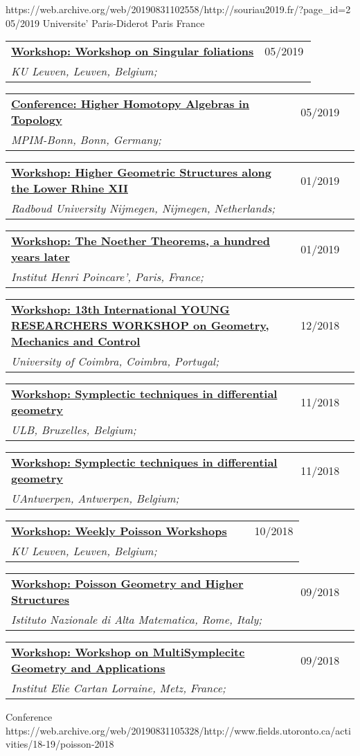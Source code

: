 \documentclass[a4paper]{article}
\newcommand{\longvoice}[8]{
	\begin{tabular}{p{0.83\linewidth} p{0.17\linewidth} }
		\textbf{\href{#3}{#2: #1}} & #4 
		\\ 
		\textit{#5, #6, #7;} & {\small\emph{#8}}
	\end{tabular}
	\vspace{.5em}
}
\begin{document}
		{https://web.archive.org/web/20190831102558/http://souriau2019.fr/?page_id=2}
		{05/2019}
		{Universite' Paris-Diderot}
		{Paris}
		{France}
		{}
	\longvoice{Workshop on Singular foliations}
		{Workshop}
		{https://wis.kuleuven.be/agenda/sem-geometry/sem-geometry-upcoming}
		{05/2019}
		{KU Leuven}
		{Leuven}
		{Belgium}
		{}
	\longvoice{Higher Homotopy Algebras in Topology}
		{Conference}
		{https://web.archive.org/web/20190831103619/https://www.mpim-bonn.mpg.de/node/9245}
		{05/2019}
		{MPIM-Bonn}
		{Bonn}
		{Germany}
		{}
	\longvoice{Higher Geometric Structures along the Lower Rhine XII}
		{Workshop}
		{https://web.archive.org/web/20190831103524/https://www.math.ru.nl/~sagave/higher-structures-XII/}
		{01/2019}
		{Radboud University Nijmegen}
		{Nijmegen}
		{Netherlands}
		{}
	\longvoice{The Noether Theorems, a hundred years later}
		{Workshop}
		{https://web.archive.org/web/20190831105634/http://noether.iecl.univ-lorraine.fr/noether_en.html}
		{01/2019}
		{Institut Henri Poincare'}
		{Paris}
		{France}
		{}
	\longvoice{13th International YOUNG RESEARCHERS WORKSHOP on Geometry, Mechanics and Control}
		{Workshop}
		{https://web.archive.org/web/20190831103121/http://www.uc.pt/en/congressos/13yrw/programa}
		{12/2018}
		{University of Coimbra}
		{Coimbra}
		{Portugal}
		{}
	\longvoice{Symplectic techniques in differential geometry}
		{Workshop}
		{https://www.uantwerpen.be/nl/personeel/sonja-hohloch/private-webpage/excellence-of-scienc/minicourses/}
		{11/2018}
		{ULB}
		{Bruxelles}
		{Belgium}
		{}
	\longvoice{Symplectic techniques in differential geometry}
		{Workshop}
		{https://www.uantwerpen.be/nl/personeel/sonja-hohloch/private-webpage/excellence-of-scienc/minicourses/}
		{11/2018}
		{UAntwerpen}
		{Antwerpen}
		{Belgium}
		{}
	\longvoice{Weekly Poisson Workshops}
		{Workshop}
		{https://wis.kuleuven.be/meetkunde/PoissonWorkingGroup}
		{10/2018}
		{KU Leuven}
		{Leuven}
		{Belgium}
		{}
	\longvoice{Poisson Geometry and Higher Structures}
		{Workshop}
		{https://web.archive.org/web/20190831103317/http://www1.mat.uniroma1.it/ricerca/convegni/2018/hippo2018/index.html}
		{09/2018}
		{Istituto Nazionale di Alta Matematica}
		{Rome}
		{Italy}
		{}
	\longvoice{Workshop on MultiSymplecitc Geometry and Applications}
		{Workshop}
		{https://web.archive.org/web/20180704152639/http://www.math.univ-metz.fr/~wurzbacher/GEMSA.html}
		{09/2018}
		{Institut Elie Cartan Lorraine}
		{Metz}
		{France}
		{}
		{Conference}
		{https://web.archive.org/web/20190831105328/http://www.fields.utoronto.ca/activities/18-19/poisson-2018}
\end{document}
